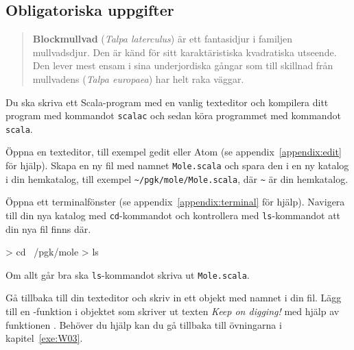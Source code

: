
\Lab{\LabWeekFOUR}
\begin{Goals}

\end{Goals}

\begin{Preparations}
\item {}
\item {}
\end{Preparations}



\subsection{Obligatoriska uppgifter}


\begin{quote}
\textbf{Blockmullvad} (\textit{Talpa laterculus}) är ett fantasidjur i familjen mullvadsdjur.
Den är känd för sitt karaktäristiska kvadratiska utseende.
Den lever mest ensam i sina underjordiska gångar som till skillnad från mullvadens (\emph{Talpa europaea}) har helt raka väggar.
\end{quote}

\begin{figure}
\end{figure}

\Task
Du ska skriva ett Scala-program med en vanlig texteditor och kompilera ditt program med kommandot \texttt{scalac} och sedan köra programmet med kommandot \texttt{scala}.

\Subtask
Öppna en texteditor, till exempel gedit eller Atom (se appendix~\ref{appendix:edit} för hjälp).
Skapa en ny fil med namnet \texttt{Mole.scala} och spara den i en ny katalog i din hemkatalog, till exempel \texttt{\textasciitilde/pgk/mole/Mole.scala}, där \texttt{\textasciitilde} är din hemkatalog.

\Subtask
Öppna ett terminalfönster (se appendix~\ref{appendix:terminal} för hjälp).
Navigera till din nya katalog med \texttt{cd}-kommandot  och kontrollera med \texttt{ls}-kommandot  att din nya fil finns där.
\begin{REPLnonum}
> cd ~/pgk/mole
> ls
\end{REPLnonum}
Om allt går bra ska \texttt{ls}-kommandot skriva ut \texttt{Mole.scala}.

\Subtask
Gå tillbaka till din texteditor och skriv in ett objekt med namnet  i din fil.
Lägg till en -funktion i objektet som skriver ut texten \emph{Keep on digging!} med hjälp av funktionen .
Behöver du hjälp kan du gå tillbaka till övningarna i kapitel~\ref{exe:W03}.

